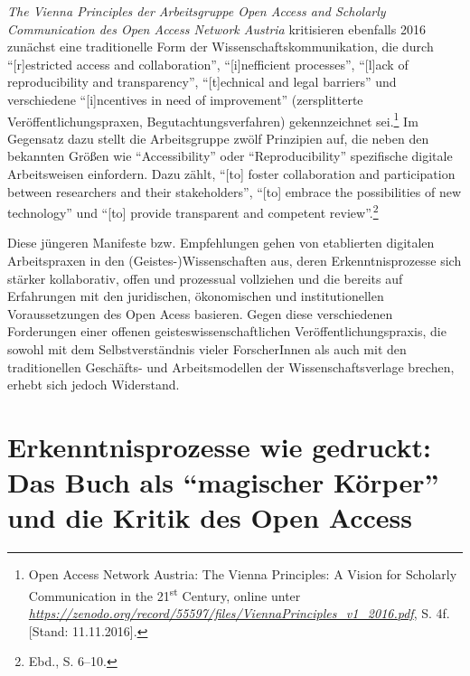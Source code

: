 \documentclass[a4paper,
fontsize=11pt,
oneside,
numbers=noperiodatend,
parskip=half-,
bibliography=totoc,
final
]{scrartcl}
\begin{document}
\emph{The Vienna Principles der Arbeitsgruppe Open Access and Scholarly
Communication des Open Access Network Austria} kritisieren ebenfalls
2016 zunächst eine traditionelle Form der Wissenschaftskommunikation,
die durch \enquote{{[}r{]}estricted access and collaboration},
\enquote{{[}i{]}nefficient processes}, \enquote{{[}l{]}ack of
reproducibility and transparency}, \enquote{{[}t{]}echnical and legal
barriers} und verschiedene \enquote{{[}i{]}ncentives in need of
improvement} (zersplitterte Veröffentlichungspraxen,
Begutachtungsverfahren) gekennzeichnet sei.\footnote{Open Access Network
  Austria: The Vienna Principles: A Vision for Scholarly Communication
  in the 21\textsuperscript{st} Century, online unter
  \href{https://zenodo.org/record/55597/files/ViennaPrinciples_v1_2016.pdf}{\emph{https://zenodo.org/record/55597/files/ViennaPrinciples\_v1\_2016.pdf}},
  S. 4f. {[}Stand: 11.11.2016{]}.} Im Gegensatz dazu stellt die
Arbeitsgruppe zwölf Prinzipien auf, die neben den bekannten Größen wie
\enquote{Accessibility} oder \enquote{Reproducibility} spezifische
digitale Arbeitsweisen einfordern. Dazu zählt, \enquote{{[}to{]} foster
collaboration and participation between researchers and their
stakeholders}, \enquote{{[}to{]} embrace the possibilities of new
technology} und \enquote{{[}to{]} provide transparent and competent
review}.\footnote{Ebd., S. 6--10.}

Diese jüngeren Manifeste bzw. Empfehlungen gehen von etablierten
digitalen Arbeitspraxen in den (Geistes-)Wissenschaften aus, deren
Erkenntnisprozesse sich stärker kollaborativ, offen und prozessual
vollziehen und die bereits auf Erfahrungen mit den juridischen,
ökonomischen und institutionellen Voraussetzungen des Open Acess
basieren. Gegen diese verschiedenen Forderungen einer offenen
geisteswissenschaftlichen Veröffentlichungspraxis, die sowohl mit dem
Selbstverständnis vieler ForscherInnen als auch mit den traditionellen
Geschäfts- und Arbeitsmodellen der Wissenschaftsverlage brechen, erhebt
sich jedoch Widerstand.

\section*{\texorpdfstring{Erkenntnisprozesse wie gedruckt: Das Buch
als \enquote{magischer Körper} und die Kritik des Open
Access}{Erkenntnisprozesse wie gedruckt: Das Buch als magischer Körper und die Kritik des Open Access}}\label{erkenntnisprozesse-wie-gedruckt-das-buch-als-magischer-kuxf6rper-und-die-kritik-des-open-access}
\end{document}
